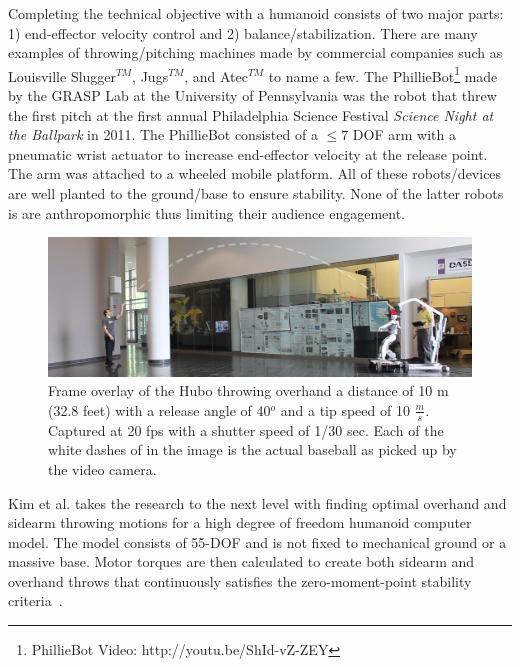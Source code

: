 Completing the technical objective with a humanoid consists of two major parts: 1) end-effector velocity control and 2) balance/stabilization. 
There are many examples of throwing/pitching machines made by commercial companies such as Louisville Slugger$^{TM}$, Jugs$^{TM}$, and Atec$^{TM}$ to name a few.  
The PhillieBot\footnote{PhillieBot Video: http://youtu.be/ShId-vZ-ZEY} made by the GRASP Lab at the University of Pennsylvania was the robot that threw the first pitch at the first annual Philadelphia Science Festival \textit{Science Night at the Ballpark} in 2011.  
The PhillieBot consisted of a $\leq 7$ DOF arm with a pneumatic wrist actuator to increase end-effector velocity at the release point.  
The arm was attached to a wheeled mobile platform.
All of these robots/devices are well planted to the ground/base to ensure stability.
None of the latter robots is are anthropomorphic thus limiting their audience engagement.

\begin{figure}[t]
  \centering
\includegraphics[width=1.0\textwidth]{./pix/preThrow2.png}
  \caption{Frame overlay of the Hubo throwing overhand a distance of 10 m (32.8 feet) with a release angle of 40$^o$ and a tip speed of 10 $\frac{m}{s}$.  Captured at 20 fps with a shutter speed of 1/30 sec.  Each of the white dashes of in the image is the actual baseball as picked up by the video camera.}
  \label{fig:hubo-throw-test}
\end{figure}


Kim et al. \cite{5686315} takes the research to the next level with finding optimal overhand and sidearm throwing motions for a high degree of freedom humanoid computer model.  
The model consists of 55-DOF and is not fixed to mechanical ground or a massive base.  
Motor torques are then calculated to create both sidearm and overhand throws that continuously satisfies the zero-moment-point stability criteria~\cite{4309277}.  

